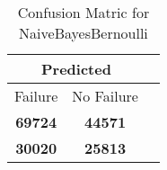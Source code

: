 \begin{table}[] 
\caption{Confusion Matric for NaiveBayesBernoulli} 
\label{Table: Prediction Accuracy-DMDNaiveBayesBernoulliOnlySunEKF-ignoreReflection-Reflection} 
\centering 
\begin{tabular} 
 {@{}ccc@{}} 
\toprule 
\multicolumn{2}{c}{\textbf{Predicted}}
 \\ \midrule 
\multicolumn{1}{|c|}{Failure} & 
\multicolumn{1}{c|}{No Failure}
 \\ \midrule 
\multicolumn{1}{|c|}{\color{green}\textbf{69724}} & 
\multicolumn{1}{c|}{\color{green}\textbf{44571}}
 \\ \midrule 
\multicolumn{1}{|c|}{\color{red}\textbf{30020}} & 
\multicolumn{1}{c|}{\color{red}\textbf{25813}}
 \\ \bottomrule 
\end{tabular} 
\end{table} 
